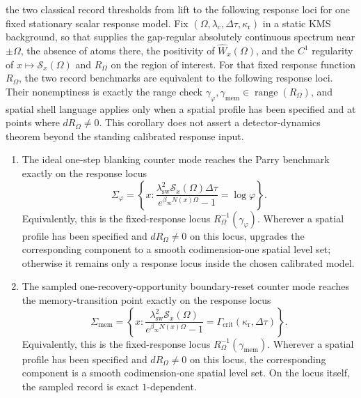 \begin{corollary}\label{thm:shells-general-main}
\ResponseStandingClause the two classical record thresholds
from  lift to the following response loci for one fixed
stationary scalar response model. Fix
$(\Omega,\lambda_c,\Delta\tau,\kappa_{\mathrm r})$ in a static KMS background,
so that  supplies the gap-regular absolutely
continuous spectrum near $\pm\Omega$, the absence of atoms there, the
positivity of $\widehat W_x(\Omega)$, and the $C^1$ regularity of
$x\mapsto\mathcal S_x(\Omega)$ and $R_\Omega$ on the region of interest. For
that fixed response function $R_\Omega$, the two record benchmarks are
equivalent to the following response loci. Their
nonemptiness is exactly the range check
$\gamma_\varphi,\gamma_{\mathrm{mem}}\in\operatorname{range}(R_\Omega)$, and
spatial shell language applies only when a spatial profile has been specified
and at points where $dR_\Omega\neq 0$.  This corollary does not assert a
detector-dynamics theorem beyond the standing calibrated response input.
\begin{enumerate}[label=\textup{(\roman*)},leftmargin=2.2em,itemsep=0.25em]
\item The ideal one-step blanking counter mode reaches the Parry benchmark
exactly on the response locus
\begin{equation}\label{eq:shell-phi-general-main}
\Sigma_{\varphi}=
\left\{x:
\frac{\lambda_{\mathrm{sw}}^2\mathcal S_x(\Omega)\Delta\tau}{e^{\beta_\infty N(x)\Omega}-1}=\log\varphi
\right\}.
\end{equation}
Equivalently, this is the fixed-response locus $R_\Omega^{-1}(\gamma_\varphi)$.
Wherever a spatial profile has been specified and \(dR_\Omega\neq0\) on this
locus,  upgrades the corresponding component to
a smooth codimension-one spatial level set; otherwise it remains only a
response locus inside the chosen calibrated model.

\item The sampled one-recovery-opportunity boundary-reset counter mode reaches
the memory-transition point exactly on the response locus
\begin{equation}\label{eq:shell-mem-general-main}
\Sigma_{\mathrm{mem}}=
\left\{x:
\frac{\lambda_{\mathrm{sw}}^2\mathcal S_x(\Omega)}{e^{\beta_\infty N(x)\Omega}-1}
=\Gamma_{\mathrm{crit}}(\kappa_{\mathrm r},\Delta\tau)
\right\}.
\end{equation}
Equivalently, this is the fixed-response locus
$R_\Omega^{-1}(\gamma_{\mathrm{mem}})$. Wherever a spatial profile has been
specified and \(dR_\Omega\neq0\) on this locus, the corresponding component is
a smooth codimension-one spatial level set. On the locus itself, the sampled
record is exact $1$-dependent.
\end{enumerate}
\end{corollary}

